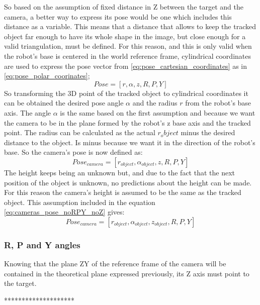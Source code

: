 	So based on the assumption of fixed distance in Z between the target and the camera, a better way to express its pose would be one which includes this distance as a variable.  
	This means that a distance that allows to keep the tracked object far enough to have its whole shape in the image, but close enough for a valid triangulation, must be defined.
	For this reason, and this is only valid when the robot's base is centered in the world reference frame, cylindrical coordinates are used to express the pose vector from \ref{eq:pose_cartesian_coordinates} as in \ref{eq:pose_polar_coorinates};
		\begin{equation}
		\label{eq:pose_polar_coorinates}
			Pose = [r,\alpha,z,R,P,Y]
		\end{equation}
	So transforming the 3D point of the tracked object to cylindrical coordinates it can be obtained the desired pose angle $\alpha$ and the radius $r$ from the robot's base axis. 
	The angle $\alpha$ is the same based on the first assumption and because we want the camera to be in the plane formed by the robot's z base axis and the tracked point. 
	The radius can be calculated as the actual $r_object$ minus the desired distance to the object. Is minus because we want it in the direction of the robot's base. 
	So the camera's pose is now defined as:
		\begin{equation}
		\label{eq:cameras_pose_noRPY_noZ}
			Pose_{camera} = [r_{object},\alpha_{object},z,R,P,Y]
		\end{equation}
	The height keeps being an unknown but, and due to the fact that the next position of the object is unknown, no predictions about the height can be made. 
	For this reason the camera's height is assumed to be the same as the tracked object. This assumption included in the equation \ref{eq:cameras_pose_noRPY_noZ} gives:
		\begin{equation}
			\label{eq:cameras_pose_noRPY}
			Pose_{camera} = [r_{object},\alpha_{object},z_{object},R,P,Y]
		\end{equation}
	\subsubsection{R, P and Y angles} %
	\label{subsub:r_p_and_y_angles}
	Knowing that the plane ZY of the reference frame of the camera will be contained in the theoretical plane expressed previously, its Z axis must point to the target.

	******************** 

